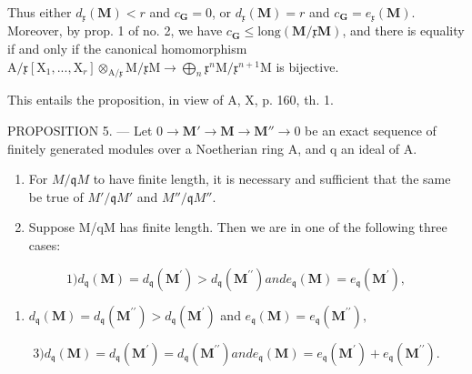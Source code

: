 Thus either \(d_{\mathfrak{x}}(\mathbf{M}) < r\) and \(c_{\mathbf{G}} = 0\), or \(d_{\mathfrak{x}}(\mathbf{M}) = r\) and \(c_{\mathbf{G}} = e_{\mathfrak{x}}(\mathbf{M})\). Moreover, by prop. 1 of no. 2, we have \(c_{\mathbf{G}} \leqslant \text{long}(\mathbf{M}/\mathfrak{x}\mathbf{M})\), and there is equality if and only if the canonical homomorphism \(\mathrm{A}/\mathfrak{x}[\mathrm{X}_{1}, ..., \mathrm{X}_{r}] \otimes_{\mathrm{A}/\mathfrak{x}} \mathrm{M}/\mathfrak{x}\mathrm{M} \to \bigoplus_{n}\mathfrak{x}^{n}\mathrm{M}/\mathfrak{x}^{n+1}\mathrm{M}\) is bijective.

This entails the proposition, in view of A, X, p. 160, th. 1.

PROPOSITION 5. --- Let \(0 \to \mathbf{M}' \to \mathbf{M} \to \mathbf{M}'' \to 0\) be an exact sequence of finitely generated modules over a Noetherian ring A, and q an ideal of A.

\begin{enumerate}
\def\labelenumi{\alph{enumi})}
\item
  For \(M/\mathfrak{q}M\) to have finite length, it is necessary and sufficient that the same be true of \(M'/\mathfrak{q}M'\) and \(M''/\mathfrak{q}M''\).
\item
  Suppose M/qM has finite length. Then we are in one of the following three cases:
\end{enumerate}

\[
1) d _ {\mathfrak {q}} (\mathbf {M}) = d _ {\mathfrak {q}} \left(\mathbf {M} ^ {\prime}\right) > d _ {\mathfrak {q}} \left(\mathbf {M} ^ {\prime \prime}\right) and e _ {\mathfrak {q}} (\mathbf {M}) = e _ {\mathfrak {q}} \left(\mathbf {M} ^ {\prime}\right),
\]

\begin{enumerate}
\def\labelenumi{\arabic{enumi})}
\setcounter{enumi}{1}
\tightlist
\item
  \(d_{\mathfrak{q}}(\mathbf{M}) = d_{\mathfrak{q}}(\mathbf{M}^{\prime \prime}) > d_{\mathfrak{q}}(\mathbf{M}^{\prime})\) and \(e_{\mathfrak{q}}(\mathbf{M}) = e_{\mathfrak{q}}(\mathbf{M}^{\prime \prime}),\)
\end{enumerate}

\[
3) d _ {\mathfrak {q}} (\mathbf {M}) = d _ {\mathfrak {q}} \left(\mathbf {M} ^ {\prime}\right) = d _ {\mathfrak {q}} \left(\mathbf {M} ^ {\prime \prime}\right) and e _ {\mathfrak {q}} (\mathbf {M}) = e _ {\mathfrak {q}} \left(\mathbf {M} ^ {\prime}\right) + e _ {\mathfrak {q}} \left(\mathbf {M} ^ {\prime \prime}\right).
\]

